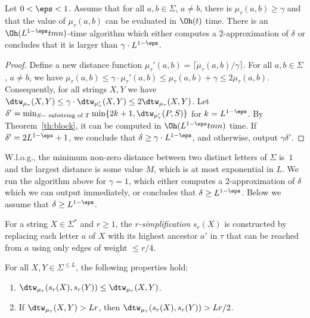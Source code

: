 \begin{claim}\label{claim:dtw_large}
Let $0 < \eps < 1$. Assume that for all $a,b \in \Sigma$, $a \neq b$, there is $\mu_\tau(a,b) \ge \gamma$ and that the value of $\mu_\tau(a,b)$ can be evaluated in $\Oh(t)$ time. There is an $\Oh(L^{1-\eps} tmn)$-time algorithm which either computes a $2$-approximation of $\delta$ or concludes that it is larger than $\gamma \cdot L^{1-\eps}$. 
\end{claim}
\begin{proof}
Define a new distance function $\mu_\tau'(a,b) = \lceil \mu_\tau(a,b)/\gamma \rceil$. For all $a,b \in \Sigma$, $a \neq b$, we have $\mu_\tau(a,b) \leq \gamma \cdot \mu_\tau'(a,b) \le \mu_\tau(a,b) + \gamma \le 2 \mu_\tau(a,b)$. 
Consequently, for all strings $X,Y$ we have $\dtw_{\mu_\tau}(X,Y) \le \gamma \cdot \dtw_{\mu_\tau'}(X,Y) \le 2 \dtw_{\mu_\tau}(X,Y)$. 
Let $\delta' = \min_{S-\text{ substring of } T} \min\{2k+1, \dtw_{\mu_\tau'}(P,S)\}$ for $k = L^{1 - \eps}$. By Theorem~\ref{th:block}, it can be computed in $\Oh(L^{1-\eps} tmn)$ time. If $\delta' = 2L^{1 - \eps}+1$, we conclude that $\delta \geq \gamma \cdot L^{1 - \eps}$, and otherwise, output $\gamma \delta'$.
\end{proof}

W.l.o.g., the minimum non-zero distance between two distinct letters of $\Sigma$ is~$1$ and the largest distance is some value $M$, which is at most exponential
in $L$. We run the algorithm above for $\gamma = 1$, which either computes a $2$-approximation of $\delta$ which we can output immediately, or concludes that $\delta \ge L^{1 -\eps}$. Below we assume that $\delta \ge L^{1 -\eps}$. 

\begin{definition}[$r$-simplification]
For a string $X \in \Sigma^\ast$ and $r \ge 1$, the
\emph{$r$-simplification} $s_r(X)$ is constructed by replacing
each letter $a$ of $X$ with its highest ancestor $a'$ in $\tau$ that can
be reached from $a$ using only edges of weight $\le r / 4$.
\end{definition}

\begin{fact}\label{fact:simplified}
For all $X,Y \in \Sigma^{\le L}$, the following properties hold:
\begin{enumerate}
  \item $\dtw_{\mu_\tau}(s_r(X), s_r(Y)) \le \dtw_{\mu_\tau}(X,Y)$.
  \item If $\dtw_{\mu_\tau}(X,Y) > L r$, then $\dtw_{\mu_\tau}(s_r(X), s_r(Y)) > L r/2$. 
\end{enumerate}
\end{fact}

